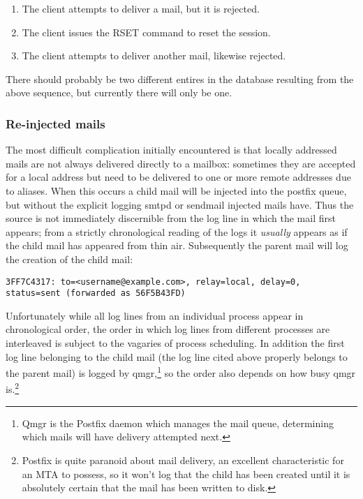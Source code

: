 \documentclass[a4paper,12pt,draft]{article}
\begin{document}
\begin{enumerate}

    \item The client attempts to deliver a mail, but it is rejected.

    \item The client issues the RSET command to reset the session.

    \item The client attempts to deliver another mail, likewise rejected.

\end{enumerate}

There should probably be two different entires in the database resulting
from the above sequence, but currently there will only be one.



\subsubsection{Re-injected mails}

The most difficult complication initially encountered is that locally
addressed mails are not always delivered directly to a mailbox: sometimes
they are accepted for a local address but need to be delivered to one or
more remote addresses due to aliases.  When this occurs a child mail will
be injected into the postfix queue, but without the explicit logging smtpd
or sendmail injected mails have.  Thus the source is not immediately
discernible from the log line in which the mail first appears; from a
strictly chronological reading of the logs it \textit{usually\/} appears as
if the child mail has appeared from thin air.  Subsequently the parent mail
will log the creation of the child mail:

\texttt{3FF7C4317: to=<username@example.com>, relay=local, \newline 
delay=0, status=sent (forwarded as 56F5B43FD)}

Unfortunately while all log lines from an individual process appear in
chronological order, the order in which log lines from different processes
are interleaved is subject to the vagaries of process scheduling.  In
addition the first log line belonging to the child mail (the log line cited
above properly belongs to the parent mail) is logged by qmgr,\footnote{Qmgr
is the Postfix daemon which manages the mail queue, determining which mails
will have delivery attempted next.} so the order also depends on how busy
qmgr is.\footnote{Postfix is quite paranoid about mail delivery, an
excellent characteristic for an MTA to possess, so it won't log that the
child has been created until it is absolutely certain that the mail has
been written to disk.}
\end{document}
